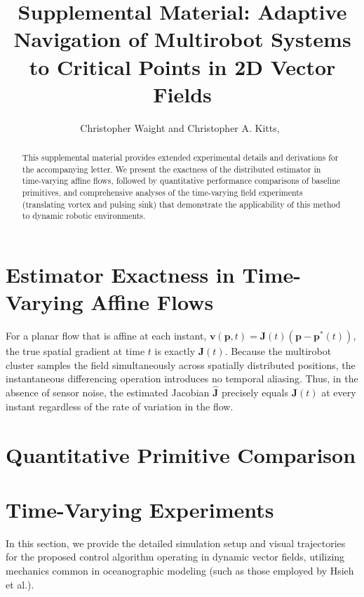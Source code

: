 \documentclass[lettersize,journal]{IEEEtran}
\begin{document}
\title{Supplemental Material: Adaptive Navigation of Multirobot Systems to Critical Points in 2D Vector Fields}
\author{Christopher Waight and Christopher A. Kitts,~}

\maketitle

\begin{abstract}
This supplemental material provides extended experimental details and derivations for the accompanying letter. We present the exactness of the distributed estimator in time-varying affine flows, followed by quantitative performance comparisons of baseline primitives, and comprehensive analyses of the time-varying field experiments (translating vortex and pulsing sink) that demonstrate the applicability of this method to dynamic robotic environments.
\end{abstract}

\section{Estimator Exactness in Time-Varying Affine Flows}
For a planar flow that is affine at each instant, $\mathbf{v}(\mathbf{p}, t) = \mathbf{J}(t)(\mathbf{p} - \mathbf{p}^*(t))$, the true spatial gradient at time $t$ is exactly $\mathbf{J}(t)$. Because the multirobot cluster samples the field simultaneously across spatially distributed positions, the instantaneous differencing operation introduces no temporal aliasing. Thus, in the absence of sensor noise, the estimated Jacobian $\mathbf{\hat{J}}$ precisely equals $\mathbf{J}(t)$ at every instant regardless of the rate of variation in the flow.

\section{Quantitative Primitive Comparison}

\section{Time-Varying Experiments}
In this section, we provide the detailed simulation setup and visual trajectories for the proposed control algorithm operating in dynamic vector fields, utilizing mechanics common in oceanographic modeling (such as those employed by Hsieh et al.).
\end{document}
